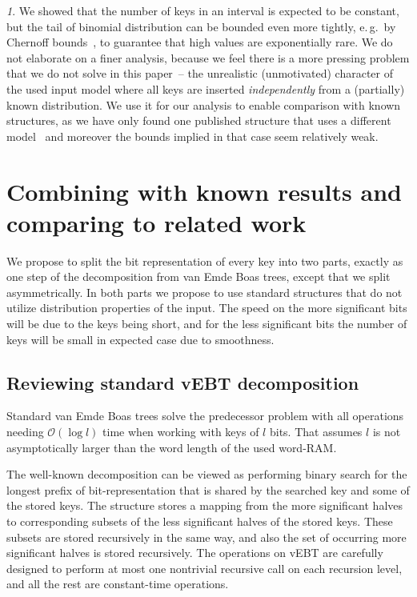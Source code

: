 \documentclass[
submission
]{dmtcs-episciences}
\theoremstyle{plain}
\theoremstyle{definition}
\theoremstyle{remark}
\newtheorem*{rem*}{\protect\remarkname}
\theoremstyle{plain}
\theoremstyle{plain}
\providecommand{\remarkname}{Remark}
\def\OO{\mathcal O}
\begin{document}
\begin{rem*}
We showed that the number of keys in an interval is expected to be constant, but the tail of binomial distribution can be bounded even more tightly, e.\,g.~by Chernoff bounds~\cite[chapter~4.1]{randomAlgs}, to guarantee that high values are exponentially rare.
We do not elaborate on a finer analysis, because we feel there is a more pressing problem that we do not solve in this paper~-- the unrealistic (unmotivated) character of the used input model where all keys are inserted \emph{independently} from a (partially) known distribution.
We use it for our analysis to enable comparison with known structures, as we have only found one published structure that uses a different model~\cite{DemaineJP04} and moreover the bounds implied in that case seem relatively weak.
\end{rem*}


\section{Combining with known results and comparing to related work \label{sec:main-results}}

We propose to split the bit representation of every key into two parts,
exactly as one step of the decomposition from van Emde Boas trees,
except that we split asymmetrically. In both parts we propose to use
standard structures that do not utilize distribution properties of
the input. The speed on the more significant bits will be due to the
keys being short, and for the less significant bits the number of
keys will be small in expected case due to smoothness.

\subsection{Reviewing standard vEBT decomposition}

Standard van Emde Boas trees solve the predecessor problem with all
operations needing $\OO(\log l)$ time when working with keys of $l$
bits. That assumes $l$ is not asymptotically larger than the word
length of the used word-RAM.

The well-known decomposition can be viewed as performing binary search
for the longest prefix of bit-representation that is shared by the
searched key and some of the stored keys. The structure stores a mapping
from the more significant halves to corresponding subsets of the less
significant halves of the stored keys. These subsets are stored recursively
in the same way, and also the set of occurring more significant halves
is stored recursively. The operations on vEBT are carefully designed
to perform at most one nontrivial recursive call on each recursion
level, and all the rest are constant-time operations.
\end{document}
